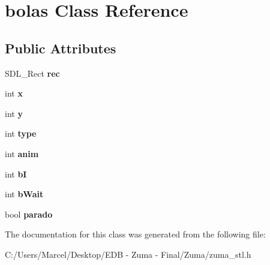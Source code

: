 \hypertarget{classbolas}{\section{bolas Class Reference}
\label{classbolas}
}
\subsection*{Public Attributes}
\begin{DoxyCompactItemize}
\item 
\hypertarget{classbolas_ab7885c831fa1260c1348d64553a48510}{S\-D\-L\-\_\-\-Rect {\bfseries rec}}\label{classbolas_ab7885c831fa1260c1348d64553a48510}

\item 
\hypertarget{classbolas_a5c149a425324e077f9644f76208cb2dc}{int {\bfseries x}}\label{classbolas_a5c149a425324e077f9644f76208cb2dc}

\item 
\hypertarget{classbolas_a2ece00d3b0b433e1dedf638b198869a3}{int {\bfseries y}}\label{classbolas_a2ece00d3b0b433e1dedf638b198869a3}

\item 
\hypertarget{classbolas_ab1cdd652843d00b767c823bf15a5c812}{int {\bfseries type}}\label{classbolas_ab1cdd652843d00b767c823bf15a5c812}

\item 
\hypertarget{classbolas_afbbe85ced8260e87594f2343455286fe}{int {\bfseries anim}}\label{classbolas_afbbe85ced8260e87594f2343455286fe}

\item 
\hypertarget{classbolas_a4c46b5abb925c374188ba15093a93df7}{int {\bfseries b\-I}}\label{classbolas_a4c46b5abb925c374188ba15093a93df7}

\item 
\hypertarget{classbolas_a2ef293d006e72a5443f25a6989417f84}{int {\bfseries b\-Wait}}\label{classbolas_a2ef293d006e72a5443f25a6989417f84}

\item 
\hypertarget{classbolas_a999555dfed3b49d13bf7c155858a50c6}{bool {\bfseries parado}}\label{classbolas_a999555dfed3b49d13bf7c155858a50c6}

\end{DoxyCompactItemize}


The documentation for this class was generated from the following file\-:\begin{DoxyCompactItemize}
\item 
C\-:/\-Users/\-Marcel/\-Desktop/\-E\-D\-B -\/ Zuma -\/ Final/\-Zuma/zuma\-\_\-stl.\-h\end{DoxyCompactItemize}
